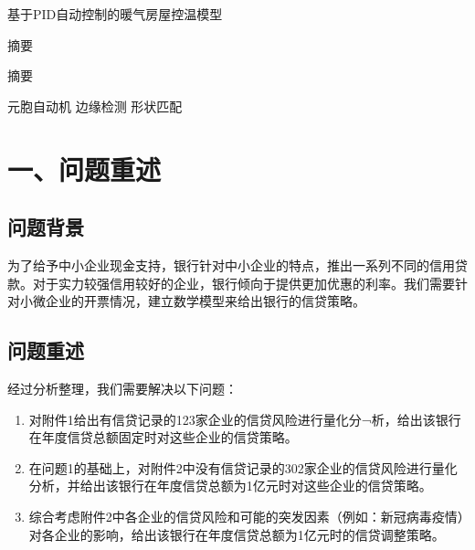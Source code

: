 \documentclass{my_paper}
\newcommand{\lunwenbiaoti}{\fontsize{15.75pt}{0}\heiti 基于PID自动控制的暖气房屋控温模型}
\newcommand{\zhaiyao}{\fontsize{14pt}{0}\heiti 摘要}
\begin{document}
\newpage
\begin{center}
\lunwenbiaoti

\vspace{2ex}
\zhaiyao
\end{center}

摘要

\begin{guanjianci}
 元胞自动机 \quad 边缘检测 \quad 形状匹配
\end{guanjianci}

\newpage
\section{一、问题重述}

\subsection{问题背景}

为了给予中小企业现金支持，银行针对中小企业的特点，推出一系列不同的信用贷款。对于实力较强信用较好的企业，银行倾向于提供更加优惠的利率。我们需要针对小微企业的开票情况，建立数学模型来给出银行的信贷策略。


\subsection{问题重述}
经过分析整理，我们需要解决以下问题：
\begin{enumerate}
    \item 对附件1给出有信贷记录的123家企业的信贷风险进行量化分¬析，给出该银行在年度信贷总额固定时对这些企业的信贷策略。
    \item 在问题1的基础上，对附件2中没有信贷记录的302家企业的信贷风险进行量化分析，并给出该银行在年度信贷总额为1亿元时对这些企业的信贷策略。
    \item 综合考虑附件2中各企业的信贷风险和可能的突发因素（例如：新冠病毒疫情）对各企业的影响，给出该银行在年度信贷总额为1亿元时的信贷调整策略。
\end{enumerate}
\end{document}
